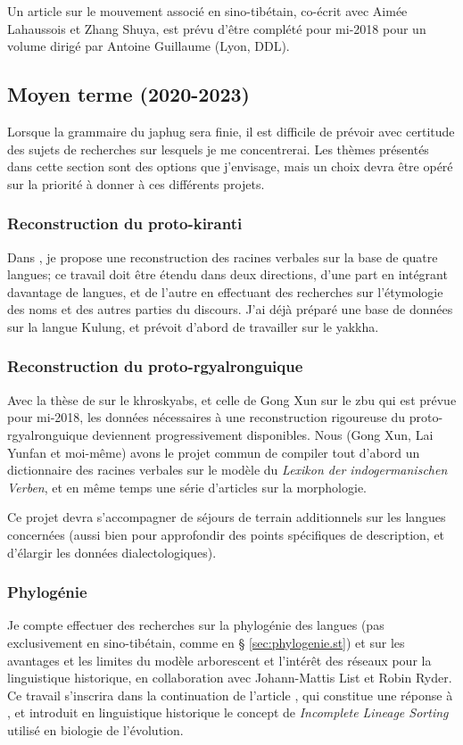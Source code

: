 \documentclass[oldfontcommands,oneside,a4paper,11pt]{article}
\begin{document}
Un article sur le mouvement associé en sino-tibétain, co-écrit avec Aimée Lahaussois et Zhang Shuya, est prévu d'être complété pour mi-2018 pour un volume dirigé par Antoine Guillaume (Lyon, DDL).
 
\subsection{Moyen terme (2020-2023)}
Lorsque la grammaire du japhug sera finie, il est difficile de prévoir avec certitude des sujets de recherches sur lesquels je me concentrerai. Les thèmes présentés dans cette section sont des options que j'envisage, mais un choix devra être opéré sur la priorité à donner à ces différents projets.

\subsubsection{Reconstruction du proto-kiranti}
Dans \citet{jacques17pkiranti}, je propose une reconstruction des racines verbales sur la base de quatre langues; ce travail doit être étendu dans deux directions, d'une part en intégrant davantage de langues, et de l'autre en effectuant des recherches sur l'étymologie des noms et des autres parties du discours. J'ai déjà préparé une base de données sur la langue Kulung, et prévoit d'abord de travailler sur le yakkha.

\subsubsection{Reconstruction du proto-rgyalronguique}

Avec la thèse de \citet{lai17khroskyabs} sur le khroskyabs, et celle de Gong Xun sur le zbu qui est prévue pour mi-2018, les données nécessaires à une reconstruction rigoureuse du proto-rgyalronguique deviennent progressivement disponibles. Nous (Gong Xun, Lai Yunfan et moi-même) avons le projet commun de compiler  tout d'abord un dictionnaire des racines verbales sur le modèle du \textit{Lexikon der indogermanischen Verben}, et en même temps une série d'articles sur la morphologie.

Ce projet devra s'accompagner de séjours de terrain additionnels sur les langues concernées (aussi bien pour approfondir des points spécifiques de description, et d'élargir les données dialectologiques).

\subsubsection{Phylogénie} \label{sec:phylogenie}
Je compte effectuer des recherches sur la phylogénie des langues (pas exclusivement en sino-tibétain, comme en § \ref{sec:phylogenie.st}) et sur les avantages et les limites du modèle arborescent et l'intérêt des réseaux pour la linguistique historique, en collaboration avec Johann-Mattis List et Robin Ryder. Ce travail s'inscrira dans la continuation de l'article \citet{list2019save.the.trees}, qui constitue une réponse à \citet{francois15tree}, et introduit en linguistique historique le concept de \textit{Incomplete Lineage Sorting} utilisé en biologie de l'évolution.
\end{document}
